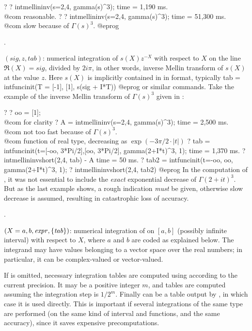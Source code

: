 \bprog
? 
? intmellininv(s=2,4, gamma(s)^3);
time = 1,190 ms. \\@com reasonable.
? 
? intmellininv(s=2,4, gamma(s)^3);
time = 51,300 ms. \\@com slow because of $\Gamma(s)^3$.
@eprog\noindent

.

$(sig,z,tab)$: numerical integration
of $s(X)z^{-X}$ with respect to $X$ on the line $\Re(X)=sig$, divided by
$2i\pi$, in other words, inverse Mellin transform of $s(X)$ at the value $z$.
Here $s(X)$ is implicitly contained in  in  format,
typically
\bprog
  tab = intfuncinit(T = [-1], [1], s(sig + I*T))
@eprog\noindent
or similar commands. Take the example of the inverse Mellin transform of
$\Gamma(s)^3$ given in :

\bprog
? 
? oo = [1]; \\@com for clarity
? A = intmellininv(s=2,4, gamma(s)^3);
time = 2,500 ms. \\@com not too fast because of $\Gamma(s)^3$.
\\ @com function of real type, decreasing as $\exp(-3\pi/2\cdot |t|)$
? tab = intfuncinit(t=[-oo, 3*Pi/2],[oo, 3*Pi/2], gamma(2+I*t)^3, 1);
time = 1,370 ms.
? intmellininvshort(2,4, tab) - A
time = 50 ms.
? tab2 = intfuncinit(t=-oo, oo, gamma(2+I*t)^3, 1);
? intmellininvshort(2,4, tab2)
@eprog\noindent
In the computation of , it was not essential to include the
\emph{exact} exponential decrease of $\Gamma(2+it)^3$. But as the last
example shows, a rough indication \emph{must} be given, otherwise slow
decrease is assumed, resulting in catastrophic loss of accuracy.

.

$(X=a,b,\hbox{\it expr\/},\{\hbox{\it tab\/}\})$: numerical integration
of  on $[a,b]$ (possibly infinite interval) with respect to $X$,
where $a$ and $b$ are coded as explained below. The integrand may have values
belonging to a vector space over the real numbers; in particular, it can be
complex-valued or vector-valued.

If  is omitted, necessary integration tables are computed using
 according to the current precision. It may be a positive
integer $m$, and tables are computed assuming the integration step is
$1/2^m$. Finally  can be a table output by , in
which case it is used directly. This is important if several integrations of
the same type are performed (on the same kind of interval and functions, and
the same accuracy), since it saves expensive precomputations.

